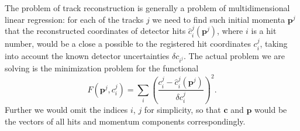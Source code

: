 %
%

The problem of track reconstruction is generally a problem of multidimensional linear regression: for each of the tracks $j$ we need to find such initial momenta $\boldsymbol{p}^j$ that the reconstructed coordinates of detector hits $\hat{c}_i^j(\boldsymbol{p}^j)$, where $i$ is a hit number, would be a close a possible to the registered hit coordinates $c_i^j$, taking into account the known detector uncertainties $\delta c_{i^j}$.
The actual problem we are solving is the minimization problem for the functional
\begin{equation}
\label{track_fit}
F(\boldsymbol{p}^j, c_i^j) = \sum_i \left(\frac{c_i^j - \hat{c}_i^j(\boldsymbol{p}^j)}{\delta c_i^j}\right)^2.
\end{equation}
Further we would omit the indices $i$, $j$ for simplicity, so that $\boldsymbol{c}$ and $\boldsymbol{p}$ would be the vectors of all hits and momentum components correspondingly.

